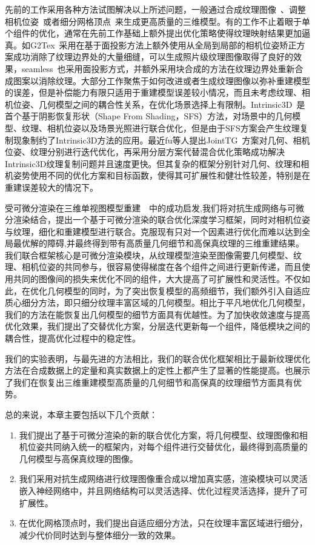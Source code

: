 先前的工作采用各种方法试图解决以上所述问题，一般通过合成纹理图像~\cite{bi2017patch}、调整相机位姿~\cite{zhou2014color}或者细分网格顶点~\cite{ChengleiWu2014RealtimeSR}来生成更高质量的三维模型。有的工作不止着眼于单个组件的优化，通常在先前工作基础上额外提出优化策略使得纹理映射结果更加逼真。如G2Tex~\cite{fu2018texture}采用在基于面投影方法上额外使用从全局到局部的相机位姿矫正方案成功消除了纹理边界处的大量细缝，可以生成照片级纹理图像取得了良好的效果，seamless~\cite{fu2021seamless}也采用面投影方式，并额外采用块合成的方法在纹理边界处重新合成图案以消除纹理。大部分工作聚焦于如何改进或者生成纹理图像以弥补重建模型的误差，但是补偿能力有限只适用于重建模型误差较小情况，而且未考虑纹理、相机位姿、几何模型之间的耦合性关系，在优化场景选择上有限制。Intrinsic3D~\cite{RobertMaier2017Intrinsic3DH3}是首个基于阴影恢复形状（Shape From Shading，SFS）方法，对场景中的几何模型、纹理、相机位姿以及场景光照进行联合优化，但是由于SFS方案会产生纹理复制现象制约了Intrinsic3D方法的应用。最近fu等人提出JointTG~\cite{YanpingFu2020JointTA}方案对几何、相机位姿、纹理分别进行迭代优化，再采用分层方案代替混合优化策略成功解决Intrinsic3D纹理复制问题并且速度更快。但其复杂的框架分别针对几何、纹理和相机姿势使用不同的优化方案和目标函数，使得其可扩展性和健壮性较差，特别是在重建误差较大的情况下。\par


受可微分渲染在三维单视图模型重建~\cite{liu2020general}~\cite{ShichenLiu2019SoftRA}中的成功启发,我们将对抗生成网络与可微分渲染结合，提出一个基于可微分渲染的联合优化深度学习框架，同时对相机位姿与纹理，细化和重建模型进行联合。克服现有只对一个因素进行优化而难以达到全局最优解的障碍,并最终得到带有高质量几何细节和高保真纹理的三维重建结果。我们联合框架核心是可微分渲染模块，从纹理模型渲染至图像需要几何模型、纹理、相机位姿的共同参与，很容易使得梯度在各个组件之间进行更新传递，而且使用共同的图像间的损失来优化不同的组件，大大提高了可扩展性和灵活性。不仅如此，在优化几何模型的同时，为了突出恢复模型的高频细节，我们额外引入自适应质心细分方法，即只细分纹理丰富区域的几何模型。相比于平凡地优化几何模型，我们的方法在能恢复出几何模型的细节方面具有优越性。为了加快收敛速度与提高优化效果，我们提出了交替优化方案，分层迭代更新每一个组件，降低模块之间的耦合性，提高优化过程中的稳定性。\par

我们的实验表明，与最先进的方法相比，我们的联合优化框架相比于最新纹理优化方法在合成数据上的定量和真实数据上的定性上都产生了显著的性能提高。也展示了我们在恢复出三维重建模型高质量的几何细节和高保真的纹理细节方面具有优势。\par
总的来说，本章主要包括以下几个贡献：\par
\begin{enumerate}
\item 我们提出了基于可微分渲染的新的联合优化方案，将几何模型、纹理图像和相机位姿共同纳入统一的框架内，对每个组件进行交替优化，最终得到高质量的几何模型与高保真纹理的图像。
\item 我们采用对抗生成网络进行纹理图像重合成以增加真实感，渲染模块可以灵活嵌入神经网络中，并且网络结构可以灵活选择、优化过程灵活选择，提升了可扩展性。
\item 在优化网格顶点时，我们提出自适应细分方法，只在纹理丰富区域进行细分，减少代价同时达到与整体细分一致的效果。
\end{enumerate}

